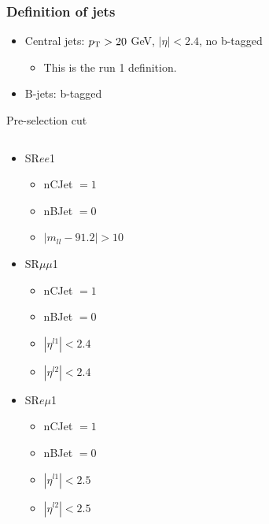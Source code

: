 \documentclass[mathserif,serif]{beamer}
\begin{document}
\begin{frame}
\frametitle{Definition of jets}
\normalsize
\begin{itemize}
\item Central jets: $p_{\text{T}}>20$ GeV, $|\eta|<2.4$, no b-tagged
\begin{itemize}
\item This is the run 1 definition.
\end{itemize}
\item B-jets: b-tagged
\end{itemize}
\end{frame}

\begin{frame}{Pre-selection cut}
\normalsize
\begin{columns}
\begin{column}{0.5\textwidth}

\begin{itemize}
\item SR$ee$1
\begin{itemize}
\item nCJet $=1$
\item nBJet $=0$
\item $|m_{ll} - 91.2| > 10$
\end{itemize}
\item SR$\mu\mu$1
\begin{itemize}
\item nCJet $=1$
\item nBJet $=0$
\item $|\eta^{l1}| < 2.4$
\item $|\eta^{l2}| < 2.4$
\end{itemize}
\item SR$e\mu$1
\begin{itemize}
\item nCJet $=1$
\item nBJet $=0$
\item $|\eta^{l1}| < 2.5$
\item $|\eta^{l2}| < 2.5$
\end{itemize}
\end{itemize}

\end{column}
\begin{column}{0.5\textwidth}


\end{column}
\end{columns}
\end{frame}
\end{document}
